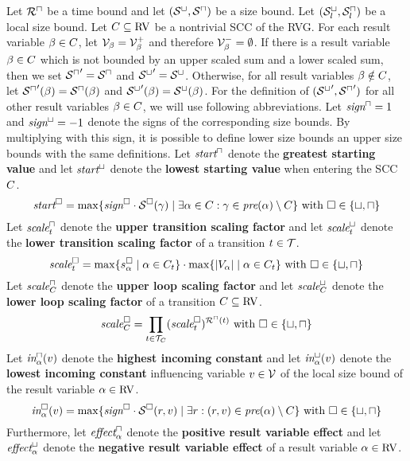 \begin{theorem}
  Let ${\mathcal{R}^\sqcap}$ be a time bound and let ${({\mathcal{S}^\sqcup}, {\mathcal{S}^\sqcap})}$ be a size bound.
  Let ${({\mathcal{S}^\sqcup_l}, {\mathcal{S}^\sqcap_l})}$ be a local size bound.
  Let $C \subseteq \text{RV}$ be a nontrivial SCC of the RVG.
  For each result variable $\beta \in C$, let $\mathcal{V}_\beta = \mathcal{V}^+_\beta$ and therefore $\mathcal{V}^-_\beta = \emptyset$.
  If there is a result variable $\beta \in C$ which is not bounded by an upper scaled sum and a lower scaled sum, then we set ${\mathcal{S}^\sqcap}' = {\mathcal{S}^\sqcap}$ and ${\mathcal{S}^\sqcup}' = {\mathcal{S}^\sqcup}$.
  Otherwise, for all result variables $\beta \notin C$, let ${\mathcal{S}^\sqcap}'(\beta) = {\mathcal{S}^\sqcap}(\beta)$ and ${\mathcal{S}^\sqcup}'(\beta) = {\mathcal{S}^\sqcup}(\beta)$.
  For the definition of $({\mathcal{S}^\sqcup}', {\mathcal{S}^\sqcap}')$ for all other result variables $\beta \in C$, we will use following abbreviations.
  Let $\emph{sign}^\sqcap = 1$ and $\emph{sign}^\sqcup = -1$ denote the signs of the corresponding size bounds.
  By multiplying with this sign, it is possible to define lower size bounds an upper size bounds with the same definitions.
  Let $\emph{start}^\sqcap$ denote the \textbf{greatest starting value} and let $\emph{start}^\sqcup$ denote the \textbf{lowest starting value} when entering the SCC $C$.
  \[ \emph{start}^\square = \max \lbrace \emph{sign}^\square \cdot {\mathcal{S}^\square}(\gamma) \mid \exists \alpha \in C: \gamma \in \emph{pre}(\alpha) \setminus C \rbrace \text{ with } \square \in \lbrace \sqcup, \sqcap \rbrace \]
  Let $\emph{scale}^\sqcap_t$ denote the \textbf{upper transition scaling factor} and let $\emph{scale}^\sqcup_t$ denote the \textbf{lower transition scaling factor} of a transition $t \in \mathcal{T}$.
  \[ \emph{scale}^\square_t = \max \lbrace s^\square_\alpha \mid \alpha \in C_t \rbrace \cdot \max \lbrace \left|V_\alpha\right| \mid \alpha \in C_t \rbrace \text{ with } \square \in \lbrace \sqcup, \sqcap \rbrace \]
  Let $\emph{scale}^\sqcap_C$ denote the \textbf{upper loop scaling factor} and let $\emph{scale}^\sqcup_C$ denote the \textbf{lower loop scaling factor} of a transition $C \subseteq \text{RV}$.
  \[ \emph{scale}^\square_C = \prod_{t \in \mathcal{T}_C} (\emph{scale}^\square_t)^{{\mathcal{R}^\sqcap}(t)} \text{ with } \square \in \lbrace \sqcup, \sqcap \rbrace \]
  Let $\emph{in}^\sqcap_\alpha(v)$ denote the \textbf{highest incoming constant} and let $\emph{in}^\sqcup_\alpha(v)$ denote the \textbf{lowest incoming constant} influencing variable $v \in \mathcal{V}$ of the local size bound of the result variable $\alpha \in \text{RV}$.
  \[ \emph{in}^\square_\alpha(v) = \max \lbrace \emph{sign}^\square \cdot {\mathcal{S}^\square}(r, v) \mid \exists r: (r, v) \in \emph{pre}(\alpha) \setminus C \rbrace \text{ with } \square \in \lbrace \sqcup, \sqcap \rbrace \]
  Furthermore, let $\emph{effect}^\sqcap_\alpha$ denote the \textbf{positive result variable effect} and let $\emph{effect}^\sqcup_\alpha$ denote the \textbf{negative result variable effect} of a result variable $\alpha \in \text{RV}$.

\end{theorem}

